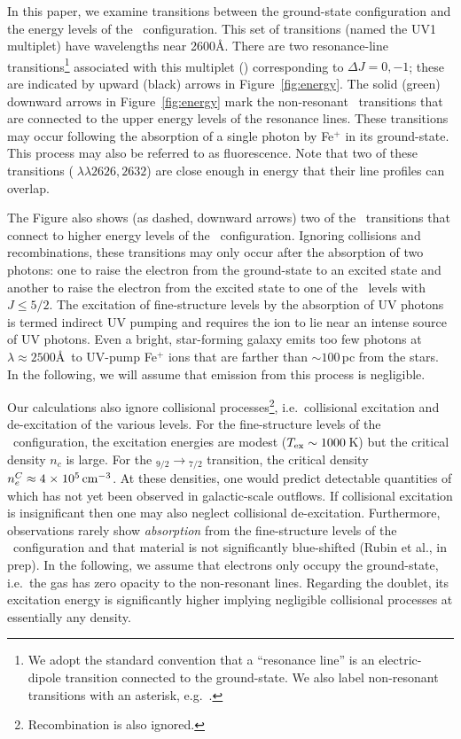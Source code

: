 \documentclass[12pt,preprint]{aastex}
\begin{document}
In this paper, we examine transitions between the ground-state
configuration and the energy levels of the \zconfig\
configuration.  This set of transitions (named the
UV1 multiplet) have wavelengths near 2600\AA.
There are two resonance-line transitions\footnote{We adopt the
  standard convention that a ``resonance line'' is an electric-dipole
  transition connected to the ground-state.  We also label
  non-resonant transitions with an asterisk, e.g.\ \feiic.} 
associated with this multiplet (\feiid)
corresponding to $\Delta J = 0, -1$; these are indicated by upward (black) arrows
in Figure~\ref{fig:energy}. The solid (green) downward
arrows in Figure~\ref{fig:energy} mark the non-resonant \feiis\
transitions that are connected to
the upper energy levels of the resonance lines.  These transitions may
occur following the absorption of a single photon by Fe$^+$ in its
ground-state.   This process may also be referred to as fluorescence.
Note that two of these transitions (\feiis$\; \lambda\lambda 2626, 2632$) are
close enough in energy that their line profiles can overlap.

The Figure also shows (as dashed, downward arrows) two of the
\feiis\ transitions that connect to higher energy levels of the \zconfig\
configuration.  Ignoring collisions and recombinations, these
transitions may only occur after the absorption
of two photons: one to raise the electron from the ground-state to an
excited state and another to raise the electron from the excited state
to one of the \zconfig\ levels with $J \le 5/2$.  The excitation of
fine-structure levels by 
the absorption of UV photons is termed indirect UV pumping
\citep[e.g][]{silva02,pcb06} and requires the ion to lie
near an intense source of UV photons.  
Even a bright, star-forming galaxy emits too few photons at $\lambda
\approx 2500$\AA\ to UV-pump Fe$^+$ ions that are farther than $\sim
100$\,pc from the stars.
In the
following, we will assume that emission from this process is
negligible.

Our calculations also ignore collisional
processes\footnote{Recombination is also ignored.}, i.e.\ collisional
excitation and de-excitation of the various levels.  For the
fine-structure levels of the \aconfig\ configuration, the excitation
energies are modest ($T_{\rm ex} \sim 1000$\,K) but the critical
density $n_c$ is large.  For the \aconfig$_{9/2} \to
$\aconfig$_{7/2}$ transition, the critical density $n_e^C \approx 4
{\; \times \; 10^{5}} \, {\rm cm^{-3}}$.  At these densities, one would predict  
detectable quantities of \ion{Fe}{1} which has not yet been observed
in galactic-scale outflows. 
If collisional excitation is insignificant 
then one may also neglect collisional de-excitation.  
Furthermore, observations rarely show
{\it absorption} from the
fine-structure levels of the \aconfig\ configuration and that material
is not significantly blue-shifted (Rubin et al., in prep). 
In the following, we assume that electrons only occupy the
ground-state, i.e.\ the gas has zero opacity to the non-resonant
lines.  
Regarding the \ion{Mg}{2} doublet, its
excitation energy is significantly higher implying 
negligible collisional processes at essentially any density.
\end{document}
